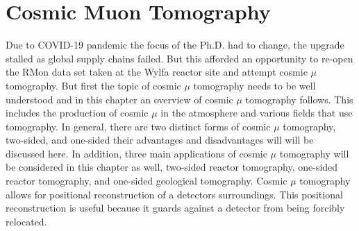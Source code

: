 
\chapter{Cosmic Muon Tomography}\label{chp:cosmicMuTelescopes}

\ifpdf
    \graphicspath{{Chapter5/Figs/Raster/}{Chapter5/Figs/PDF/}{Chapter5/Figs/}}
\else
    \graphicspath{{Chapter5/Figs/Vector/}{Chapter5/Figs/}}
\fi



Due to COVID-19 pandemic the focus of the Ph.D. had to change, the upgrade stalled as global supply chains failed. But this afforded an opportunity to re-open the RMon data set taken at the Wylfa reactor site and attempt cosmic $\mu$ tomography. But first the topic of cosmic $\mu$ tomography needs to be well understood and in this chapter an overview of cosmic $\mu$ tomography follows. This includes the production of cosmic $\mu$ in the atmosphere and various fields that use tomography. In general, there are two distinct forms of cosmic $\mu$ tomography, two-sided, and one-sided their advantages and disadvantages will will be discussed here. In addition, three main applications of cosmic $\mu$ tomography will be considered in this chapter as well, two-sided reactor tomography, one-sided reactor tomography, and one-sided geological tomography. Cosmic $\mu$ tomography allows for positional reconstruction of a detectors surroundings. This positional reconstruction is useful because it guards against a detector from being forcibly relocated. 


